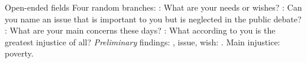 \documentclass[aspectratio=169,xcolor=dvipsnames, 11pt,mathserif]{beamer}
\begin{document}



\begin{frame}{Open-ended fields}
  \bbs \ip Four random branches:
  \bbs \ip {}: What are your needs or wishes?
 \ip {}: Can you name an issue that is important to you but is neglected in the public debate?
 \ip {}: What are your main concerns these days?
 \ip {}: What according to you is the greatest injustice of all?
  \ee
  \ip \textit{Preliminary} findings: 
  \bbs \ip {}, issue, wish: .
  \ip Main injustice: poverty.
  \ee
  \ee
\end{frame}
\end{document}
